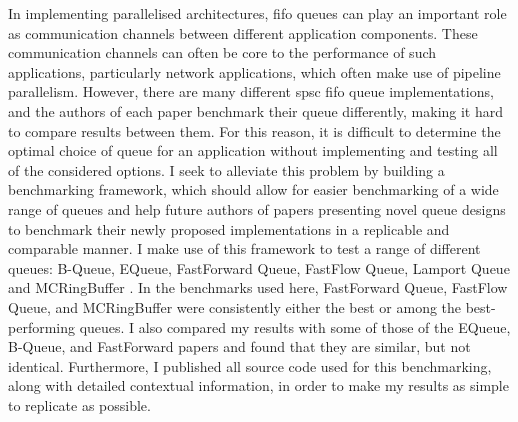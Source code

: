 \null\vfil
\begin{center}\textsf{\textbf{\abstractname}}\end{center}

\noindent In implementing parallelised architectures, \acrfull{fifo} queues can play an important role as
communication channels between different application components\cite{WangCheng2009}.
These communication channels can often be core to the performance of such applications, particularly network
applications, which often make use of pipeline parallelism\cite{Upadhyaya2007,WangCheng2009}.
However, there are many different \acrfull{spsc} \acrshort{fifo} queue implementations, and the authors of 
each paper benchmark their queue differently, making it hard to compare results between them.
For this reason, it is difficult to determine the optimal choice of queue for an application without
implementing and testing all of the considered options.
I seek to alleviate this problem by building a benchmarking framework, which should allow for easier
benchmarking of a wide range of queues and help future authors of papers presenting novel queue designs to
benchmark their newly proposed implementations in a replicable and comparable manner.
I make use of this framework to test a range of different queues: B-Queue, EQueue, FastForward Queue,
FastFlow Queue, Lamport Queue and MCRingBuffer \cite{B-Queue,EQueue,FastForward,FastFlowGithub,Lamport,MCRingBuffer}.
In the benchmarks used here, FastForward Queue, FastFlow Queue, and MCRingBuffer were consistently either the
best or among the best-performing queues.
I also compared my results with some of those of the EQueue, B-Queue, and FastForward papers and found that
they are similar, but not identical.
Furthermore, I published all source code used for this benchmarking, along with detailed contextual
information, in order to make my results as simple to replicate as possible.

\vfil\null
